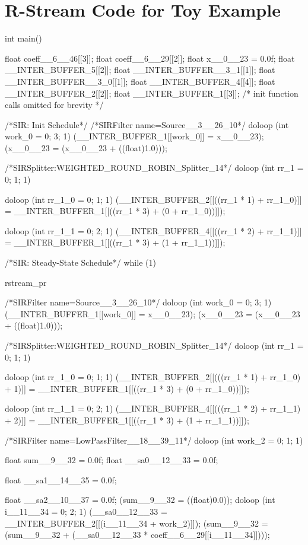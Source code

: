 \documentclass[10pt, letterpaper, onecolumn]{article}
\begin{document}
\section{R-Stream Code for Toy Example}
\label{ccode}
\scriptsize
\begin{verbatimtab}[4]
int main() {
  float coeff__6__46[[3]];
  float coeff__6__29[[2]];
  float x__0__23 = 0.0f;
  float __INTER_BUFFER_5[[2]];
  float __INTER_BUFFER__3_1[[1]];
  float __INTER_BUFFER__3_0[[1]];
  float __INTER_BUFFER_4[[4]];
  float __INTER_BUFFER_2[[2]];
  float __INTER_BUFFER_1[[3]];
  { 
/* init function calls omitted for brevity */
  }
  { 
/*SIR: Init Schedule*/
/*SIRFilter name=Source__3__26_10*/
    doloop (int work_0 = 0; 3; 1) 
      {
        (__INTER_BUFFER_1[[work_0]] = x__0__23);
        (x__0__23 = (x__0__23 + ((float)1.0)));
      }
    
/*SIRSplitter:WEIGHTED_ROUND_ROBIN_Splitter_14*/
    doloop (int rr_1 = 0; 1; 1) 
      {
        doloop (int rr_1_0 = 0; 1; 1) 
          (__INTER_BUFFER_2[[((rr_1 * 1) + rr_1_0)]] = 
	   __INTER_BUFFER_1[[((rr_1 * 3) + (0 + rr_1_0))]]);

        doloop (int rr_1_1 = 0; 2; 1) 
          (__INTER_BUFFER_4[[((rr_1 * 2) + rr_1_1)]] = 
	   __INTER_BUFFER_1[[((rr_1 * 3) + (1 + rr_1_1))]]);

      }

  }

/*SIR: Steady-State Schedule*/
  while (1) {
    rstream_pr {
      /*SIRFilter name=Source__3__26_10*/
      doloop (int work_0 = 0; 3; 1) 
	{
	  (__INTER_BUFFER_1[[work_0]] = x__0__23);
	  (x__0__23 = (x__0__23 + ((float)1.0)));
	}
      
      /*SIRSplitter:WEIGHTED_ROUND_ROBIN_Splitter_14*/
      doloop (int rr_1 = 0; 1; 1) 
	{
	  doloop (int rr_1_0 = 0; 1; 1) 
	    (__INTER_BUFFER_2[[(((rr_1 * 1) + rr_1_0) + 1)]] = 
	     __INTER_BUFFER_1[[((rr_1 * 3) + (0 + rr_1_0))]]);
	
	  doloop (int rr_1_1 = 0; 2; 1) 
	    (__INTER_BUFFER_4[[(((rr_1 * 2) + rr_1_1) + 2)]] = 
	     __INTER_BUFFER_1[[((rr_1 * 3) + (1 + rr_1_1))]]);
	
	}
    
/*SIRFilter name=LowPassFilter__18__39_11*/
      doloop (int work_2 = 0; 1; 1) 
	{
	  float sum__9__32 = 0.0f;
	  float __sa0__12__33 = 0.0f;

	  float __sa1__14__35 = 0.0f;

	  float __sa2__10__37 = 0.0f;
	  (sum__9__32 = ((float)0.0));
	  doloop (int i__11__34 = 0; 2; 1) 
	    {
	      (__sa0__12__33 =
	       __INTER_BUFFER_2[[(i__11__34 + work_2)]]);
	      (sum__9__32 = 
	       (sum__9__32 + (__sa0__12__33 * coeff__6__29[[i__11__34]])));
	    }

}}}}
\end{verbatimtab}
\end{document}
